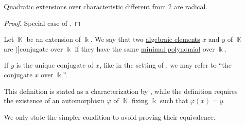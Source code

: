 \begin{corollary}\label{thm:quadratic_extension_is_radical}
  \hyperref[def:field_extension_degree]{Quadratic extensions} over characteristic different from \( 2 \) are \hyperref[def:radical_extension]{radical}.
\end{corollary}
\begin{proof}
  Special case of .
\end{proof}

\begin{definition}\label{def:conjugate_algebraic_element}
  Let \( \BbbK \) be an extension of \( \Bbbk \). We say that two \hyperref[def:algebraic_element]{algebraic elements} \( x \) and \( y \) of \( \BbbK \) are \term[en=conjugate (elements) (\cite[def. V.9.1]{Bourbaki2003Algebra4to7})]{conjugate} over \( \Bbbk \) if they have the same \hyperref[def:algebraic_element_minimal_polynomial]{minimal polynomial} over \( \Bbbk \).
\end{definition}
\begin{comments}
  \item If \( y \) is the unique conjugate of \( x \), like in the setting of , we may refer to \enquote{the conjugate \( x \) over \( \Bbbk \)}.

  \item This definition is stated as a characterization by , while the definition requires the existence of an automorphism \( \varphi \) of \( \BbbK \) fixing \( \Bbbk \) such that \( \varphi(x) = y \).

  We only state the simpler condition to avoid proving their equivalence.
\end{comments}

